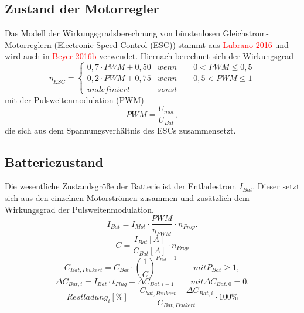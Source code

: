 \subsection{Zustand der Motorregler}
Das Modell der Wirkungsgradsberechnung von bürstenlosen Gleichstrom-Motorreglern (Electronic Speed Control (ESC)) stammt aus \textcolor{red}{Lubrano 2016} und wird auch in \textcolor{red}{Beyer 2016b} verwendet. Hiernach berechnet sich der Wirkungsgrad 
\begin{equation}
\eta_{ESC} = \begin{cases} 
0,7\cdot PWM + 0,50 & wenn \qquad 0 < PWM \leq 0,5 \\ 
0,2\cdot PWM + 0,75 & wenn \qquad 0,5 < PWM \leq 1 \\ 
undefiniert & sonst 
\end{cases}
\end{equation} 
mit der Pulsweitenmodulation (PWM) 
\begin{equation}
	PWM = \frac{U_{mot}}{U_{Bat}},
\end{equation}
die sich aus dem Spannungsverhältnis des ESCs zusammensetzt.


\subsection{Batteriezustand}
Die wesentliche Zustandsgröße der Batterie ist der Entladestrom \ensuremath{I_{Bat}}. Dieser setzt sich aus den einzelnen Motorströmen zusammen und zusätzlich dem Wirkungsgrad der Pulsweitenmodulation.
\begin{equation}
	I_{Bat} = I_{Mot}\cdot \frac{PWM}{\eta_{PWM}}\cdot n_{Prop}.
\end{equation}
\begin{equation}
	\dot{C} = \frac{I_{Bat}[A]}{C_{Bat}[A]}\cdot n_{Prop}
\end{equation}
\begin{equation}
	C_{Bat,Peukert} = C_{Bat}\cdot (\frac{1}{\dot{C}})^{P_{Bat}-1} 
	\qquad mit P_{Bat} \geq 1,
\end{equation}
\begin{equation}
	\Delta C_{Bat,i} = I_{Bat}\cdot t_{Flug} + \Delta C_{Bat,i-1} 
	\qquad mit \Delta C_{Bat,0} = 0.
\end{equation}
\begin{equation}
	Restladung_i[\%] = \frac{C_{bat,Peukert}-\Delta C_{Bat,i}}{C_{Bat,Peukert}}\cdot 100\%
\end{equation}


